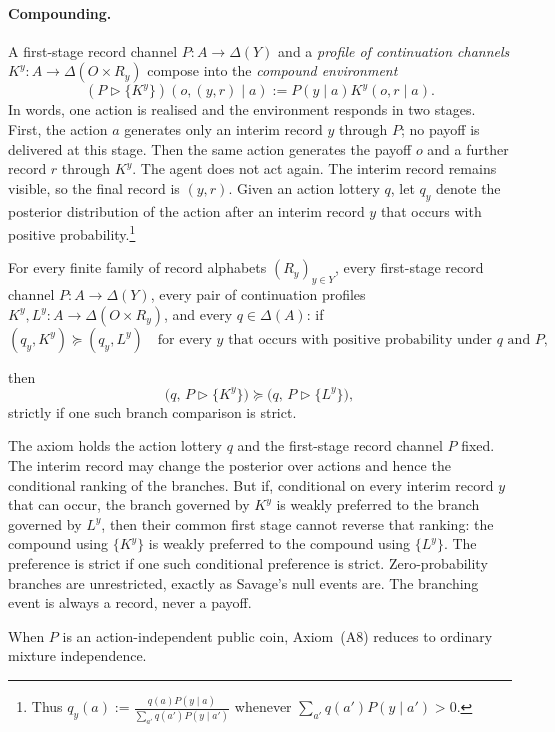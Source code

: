 \documentclass[11pt,a4paper]{article}
\theoremstyle{definition}
\newcommand{\D}{\Delta}
\newcommand{\1}{\mathbf 1}
\begin{document}
\paragraph{Compounding.}
A first-stage record channel $P:A\to\D(Y)$ and a \emph{profile of continuation channels}
$K^y:A\to\D(O\times R_y)$ compose into the \emph{compound environment}
\begin{equation}
 (P\triangleright\{K^y\})(o,(y,r)\mid a)
 :=P(y\mid a)K^y(o,r\mid a).
 \label{eq:compound}
\end{equation}
In words, one action is realised and the environment responds in two stages.  First, the action $a$ generates only
an interim record $y$ through $P$; no payoff is delivered at this stage.  Then the same action generates the payoff
$o$ and a further record $r$ through $K^y$.  The agent does not act again.  The interim record remains visible, so
the final record is $(y,r)$.  Given
an action lottery $q$, let $q_y$ denote the posterior distribution of the action after an interim record $y$ that
occurs with positive probability.\footnote{Thus
$ q_y(a):=\frac{q(a)P(y\mid a)}{\sum_{a'}q(a')P(y\mid a')}$
whenever $\sum_{a'}q(a')P(y\mid a')>0$.}

\begin{description}[leftmargin=*,style=sameline]

\item[(A8) Branchwise continuation consistency.]
For every finite family of record alphabets $(R_y)_{y\in Y}$, every first-stage record channel
$P:A\to\D(Y)$, every pair of continuation profiles $K^y,L^y:A\to\D(O\times R_y)$, and every $q\in\D(A)$: if
 \[
 (q_y,K^y)\succeq(q_y,L^y)
 \quad\text{for every $y$ that occurs with positive probability under $q$ and $P$},
 \]
\begin{samepage}then
\[
 \bigl(q,\,P\triangleright\{K^y\}\bigr)\succeq\bigl(q,\,P\triangleright\{L^y\}\bigr),
\]
strictly if one such branch comparison is strict.\end{samepage}

The axiom holds the action lottery $q$ and the first-stage record channel $P$ fixed.  The interim record may change
the posterior over actions and hence the conditional ranking of the branches.  But if, conditional on every interim
record $y$ that can occur, the branch governed by $K^y$ is weakly preferred to the branch governed by $L^y$, then
their common first stage cannot reverse that ranking: the compound using $\{K^y\}$ is weakly preferred to the
compound using $\{L^y\}$.  The preference is strict if one such conditional preference is strict.  Zero-probability
branches are unrestricted, exactly as Savage's null events are.  The branching event is always a record, never a
payoff.

When $P$ is an action-independent public coin, Axiom~\textup{(A8)} reduces to ordinary mixture independence.

\end{description}
\end{document}
